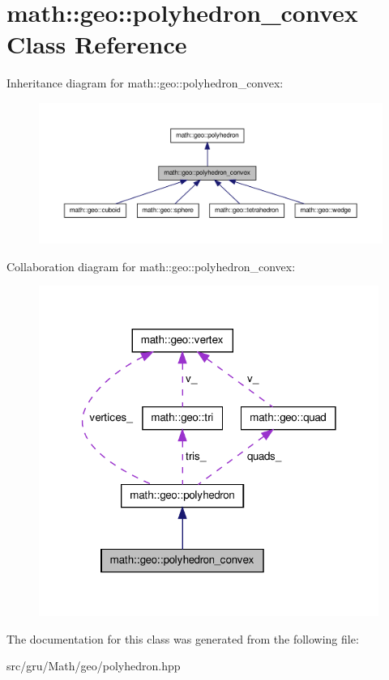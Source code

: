 \hypertarget{classmath_1_1geo_1_1polyhedron__convex}{\section{math\-:\-:geo\-:\-:polyhedron\-\_\-convex \-Class \-Reference}
\label{classmath_1_1geo_1_1polyhedron__convex}
}


\-Inheritance diagram for math\-:\-:geo\-:\-:polyhedron\-\_\-convex\-:
\nopagebreak
\begin{figure}[H]
\begin{center}
\leavevmode
\includegraphics[width=350pt]{classmath_1_1geo_1_1polyhedron__convex__inherit__graph}
\end{center}
\end{figure}


\-Collaboration diagram for math\-:\-:geo\-:\-:polyhedron\-\_\-convex\-:
\nopagebreak
\begin{figure}[H]
\begin{center}
\leavevmode
\includegraphics[width=314pt]{classmath_1_1geo_1_1polyhedron__convex__coll__graph}
\end{center}
\end{figure}


\-The documentation for this class was generated from the following file\-:\begin{DoxyCompactItemize}
\item 
src/gru/\-Math/geo/polyhedron.\-hpp\end{DoxyCompactItemize}
